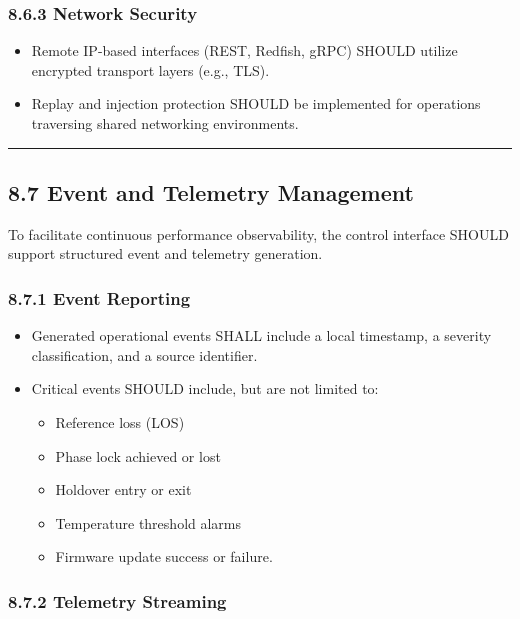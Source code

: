 \documentclass[
]{article}
\begin{document}
\subsubsection{8.6.3 Network Security}\label{network-security}

\begin{itemize}
\item
  Remote IP-based interfaces (REST, Redfish, gRPC) SHOULD utilize
  encrypted transport layers (e.g., TLS).
\item
  Replay and injection protection SHOULD be implemented for operations
  traversing shared networking environments.
\end{itemize}

\begin{center}\rule{0.5\linewidth}{0.5pt}\end{center}

\subsection{8.7 Event and Telemetry
Management}\label{event-and-telemetry-management}

To facilitate continuous performance observability, the control
interface SHOULD support structured event and telemetry generation.

\subsubsection{8.7.1 Event Reporting}\label{event-reporting}

\begin{itemize}
\item
  Generated operational events SHALL include a local timestamp, a
  severity classification, and a source identifier.
\item
  Critical events SHOULD include, but are not limited to:

  \begin{itemize}
  \item
    Reference loss (LOS)
  \item
    Phase lock achieved or lost
  \item
    Holdover entry or exit
  \item
    Temperature threshold alarms
  \item
    Firmware update success or failure.
  \end{itemize}
\end{itemize}

\subsubsection{8.7.2 Telemetry Streaming}\label{telemetry-streaming}
\end{document}
